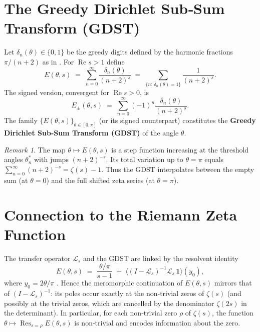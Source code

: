 \documentclass[11pt,a4paper]{article}
\theoremstyle{remark}
\newtheorem{remark}[theorem]{Remark}
\begin{document}
\section{The Greedy Dirichlet Sub‑Sum Transform (GDST)}
Let \(\delta_n(\theta)\in\{0,1\}\) be the greedy digits defined by the harmonic fractions \(\pi/(n+2)\) as in \cite{Geere2026a}.  For \(\operatorname{Re}s>1\) define
\begin{equation}\label{E}
E(\theta,s) \;=\; \sum_{n=0}^{\infty} \frac{\delta_n(\theta)}{(n+2)^s}
        \;=\; \sum_{\{n:\,\delta_n(\theta)=1\}} \frac{1}{(n+2)^s}.
\end{equation}
The signed version, convergent for \(\operatorname{Re}s>0\), is
\begin{equation}\label{Epm}
E_{\pm}(\theta,s) \;=\; \sum_{n=0}^{\infty} (-1)^n \frac{\delta_n(\theta)}{(n+2)^s}.
\end{equation}
The family \(\{E(\theta,s)\}_{\theta\in[0,\pi]}\) (or its signed counterpart) constitutes the \textbf{Greedy Dirichlet Sub‑Sum Transform (GDST)} of the angle \(\theta\).

\begin{remark}
The map \(\theta\mapsto E(\theta,s)\) is a step function increasing at the threshold angles \(\theta_n^*\) with jumps \((n+2)^{-s}\).  Its total variation up to \(\theta=\pi\) equals \(\sum_{n=0}^{\infty} (n+2)^{-s} = \zeta(s)-1\).  Thus the GDST interpolates between the empty sum (at \(\theta=0\)) and the full shifted zeta series (at \(\theta=\pi\)).
\end{remark}

\section{Connection to the Riemann Zeta Function}
The transfer operator \(\mathcal{L}_s\) and the GDST are linked by the resolvent identity
\[
E(\theta,s) \;=\; \frac{\theta/\pi}{s-1} \;+\; \bigl\langle (I-\mathcal{L}_s)^{-1}\mathcal{L}_s\,\mathbf{1}\bigr\rangle (y_0),
\]
where \(y_0=2\theta/\pi\) \cite{HSTpaper}.  Hence the meromorphic continuation of \(E(\theta,s)\) mirrors that of \((I-\mathcal{L}_s)^{-1}\): its poles occur exactly at the non‑trivial zeros of \(\zeta(s)\) (and possibly at the trivial zeros, which are cancelled by the denominator \(\zeta(2s)\) in the determinant).  In particular, for each non‑trivial zero \(\rho\) of \(\zeta(s)\), the function \(\theta\mapsto \operatorname{Res}_{s=\rho}E(\theta,s)\) is non‑trivial and encodes information about the zero.
\end{document}
